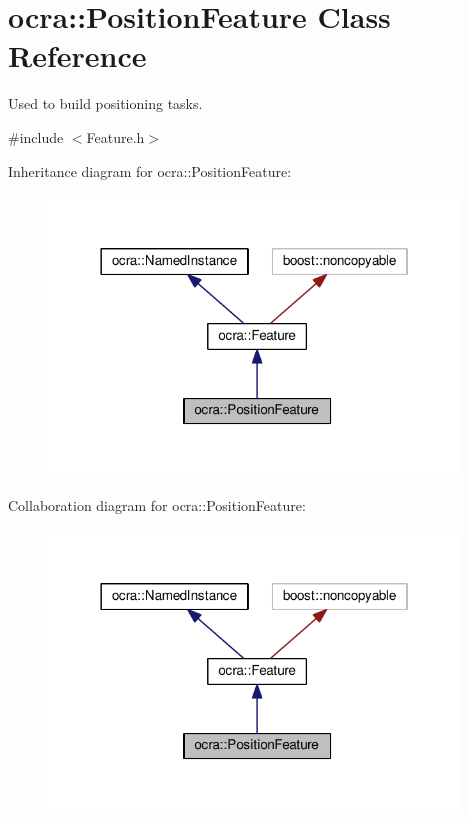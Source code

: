 \hypertarget{classocra_1_1PositionFeature}{}\section{ocra\+:\+:Position\+Feature Class Reference}
\label{classocra_1_1PositionFeature}


Used to build positioning tasks.  




{\ttfamily \#include $<$Feature.\+h$>$}



Inheritance diagram for ocra\+:\+:Position\+Feature\+:
\nopagebreak
\begin{figure}[H]
\begin{center}
\leavevmode
\includegraphics[width=310pt]{da/dd9/classocra_1_1PositionFeature__inherit__graph}
\end{center}
\end{figure}


Collaboration diagram for ocra\+:\+:Position\+Feature\+:
\nopagebreak
\begin{figure}[H]
\begin{center}
\leavevmode
\includegraphics[width=310pt]{db/d50/classocra_1_1PositionFeature__coll__graph}
\end{center}
\end{figure}
